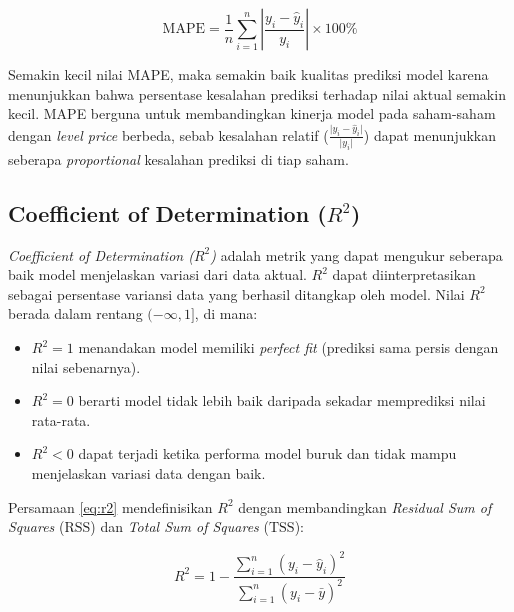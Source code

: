 \begin{equationfloat}
\begin{equation}
\text{MAPE} =
\frac{1}{n}
\sum_{i=1}^{n}
\left\lvert
  \frac{y_i - \hat{y}_i}{y_i}
\right\rvert
\times 100\%
\end{equation}
\caption{\textit{Mean Absolute Percentage Error}}
\label{eq:mape}
\end{equationfloat}

\noindent

Semakin kecil nilai MAPE, maka semakin baik kualitas prediksi model karena menunjukkan bahwa persentase kesalahan prediksi terhadap nilai aktual semakin kecil. MAPE berguna untuk membandingkan kinerja model pada saham-saham dengan \textit{level price} berbeda, sebab kesalahan relatif (\(\frac{\lvert y_i - \hat{y}_i\rvert}{\lvert y_i\rvert}\)) dapat menunjukkan seberapa \textit{proportional} kesalahan prediksi di tiap saham.

\subsection{Coefficient of Determination (\texorpdfstring{$R^2$}{R\^2})}
\label{subsec:r2}

\noindent
\textit{Coefficient of Determination ($R^2$)} adalah metrik yang dapat mengukur seberapa baik model menjelaskan variasi dari data aktual. $R^2$ dapat diinterpretasikan sebagai persentase variansi data yang berhasil ditangkap oleh model. Nilai $R^2$ berada dalam rentang $(-\infty, 1]$, di mana:
\begin{itemize}
    \item $R^2 = 1$ menandakan model memiliki \textit{perfect fit} (prediksi sama persis dengan nilai sebenarnya).
    \item $R^2 = 0$ berarti model tidak lebih baik daripada sekadar memprediksi nilai rata-rata.
    \item $R^2 < 0$ dapat terjadi ketika performa model buruk dan tidak mampu menjelaskan variasi data dengan baik.
\end{itemize}

Persamaan \ref{eq:r2} mendefinisikan $R^2$ dengan membandingkan \textit{Residual Sum of Squares} (\(\text{RSS}\)) dan \textit{Total Sum of Squares} (\(\text{TSS}\)):

\begin{equationfloat}
\begin{equation}
R^2 
= 
1
-
\frac{
  \sum_{i=1}^{n} (y_i - \hat{y}_i)^2
}{
  \sum_{i=1}^{n} (y_i - \bar{y})^2
}
\end{equation}
\caption{\textit{Coefficient of Determination} ($R^2$)}
\label{eq:r2}
\end{equationfloat}

